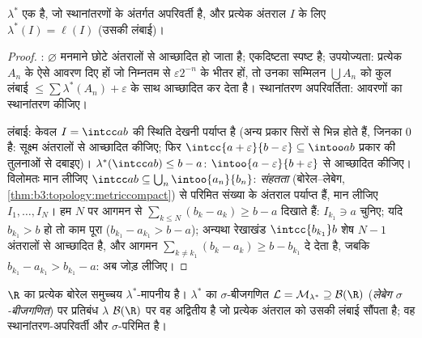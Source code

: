 \begin{lemma}\label{lem:b3:measure:outerbasics}
$\lambda^*$ एक  है, जो स्थानांतरणों के अंतर्गत अपरिवर्ती है,
और प्रत्येक अंतराल $I$ के लिए $\lambda^*(I) = \ell(I)$ (उसकी लंबाई)।
\end{lemma}

\begin{proof}
: $\varnothing$ मनमाने छोटे अंतरालों से आच्छादित हो जाता है;
एकदिष्टता स्पष्ट है; उपयोज्यता: प्रत्येक $A_n$ के ऐसे आवरण दिए
हों जो निम्नतम से $\varepsilon 2^{-n}$ के भीतर हों, तो उनका सम्मिलन $\bigcup A_n$ को
कुल लंबाई $\leq \sum
\lambda^*(A_n) + \varepsilon$ के साथ आच्छादित कर देता है। स्थानांतरण
अपरिवर्तिता: आवरणों का स्थानांतरण कीजिए।

लंबाई: केवल $I = \intcc ab$ की स्थिति देखनी पर्याप्त है (अन्य प्रकार सिरों
से भिन्न होते हैं, जिनका  $0$ है: सूक्ष्म अंतरालों से
आच्छादित कीजिए; फिर $\intcc{a+\varepsilon}{b -
\varepsilon} \subseteq \intoo ab$ प्रकार की तुलनाओं से दबाइए)। $\lambda^*(\intcc ab) \leq b - a$:
$\intoo{a-\varepsilon}{b+\varepsilon}$ से आच्छादित कीजिए। विलोमतः मान लीजिए $\intcc
ab \subseteq \bigcup_n\intoo{a_n}{b_n}$: \emph{संहतता}
(बोरेल--लेबेग, \cref{thm:b3:topology:metriccompact}) से परिमित संख्या के अंतराल पर्याप्त हैं,
मान लीजिए $I_1, \dots, I_N$। हम $N$ पर आगमन से $\sum_{k\leq N}(b_k -
a_k) \geq b - a$ दिखाते हैं: $I_{k_1} \ni a$
चुनिए; यदि $b_{k_1} > b$ हो तो काम पूरा ($b_{k_1} - a_{k_1} > b - a$); अन्यथा रेखाखंड $\intcc{b_{k_1}}b$ शेष
$N - 1$ अंतरालों से आच्छादित है, और आगमन $\sum_{k \neq k_1}(b_k - a_k)
\geq b - b_{k_1}$ दे देता है, जबकि
$b_{k_1} - a_{k_1} > b_{k_1} - a$: अब जोड़ लीजिए।
\end{proof}

\begin{theorem}[लेबेग माप]\label{thm:b3:measure:lebesgue}
$\R$ का प्रत्येक बोरेल समुच्चय $\lambda^*$-मापनीय है। $\lambda^*$ का
$\sigma$-बीजगणित $\mathcal L = \mathcal M_{\lambda^*} \supseteq \mathcal B(\R)$ (\emph{लेबेग $\sigma$-बीजगणित}) पर प्रतिबंध
$\lambda$ $\mathcal B(\R)$ पर वह अद्वितीय  है जो प्रत्येक अंतराल को उसकी
लंबाई सौंपता है; वह स्थानांतरण-अपरिवर्ती और $\sigma$-परिमित है।
\end{theorem}

